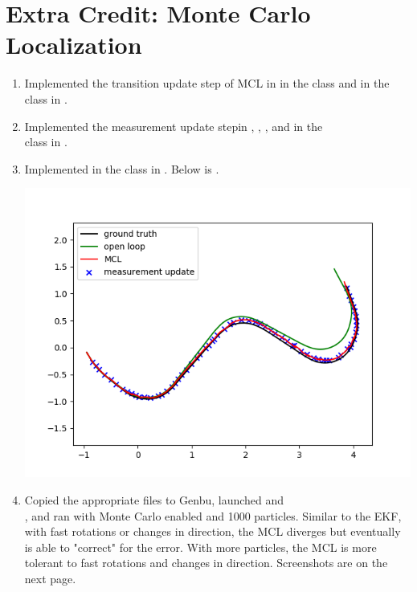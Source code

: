 \documentclass{article}
\begin{document}
\section*{Extra Credit: Monte Carlo Localization}
\begin{enumerate}[label=(\roman*)]
\item Implemented the transition update step of MCL in  in the  class and  in the  class in .
\item Implemented the measurement update stepin , , , and  in the \\  class in .

\item Implemented  in the  class in . Below is .

\includegraphics[width=\textwidth]{mc_localization.png}

\item Copied the appropriate files to Genbu, launched  and \\ , and ran  with Monte Carlo enabled and 1000 particles. Similar to the EKF, with fast rotations or changes in direction, the MCL diverges but eventually is able to "correct" for the error. With more particles, the MCL is more tolerant to fast rotations and changes in direction. Screenshots are on the next page.


\end{enumerate}
\end{document}
